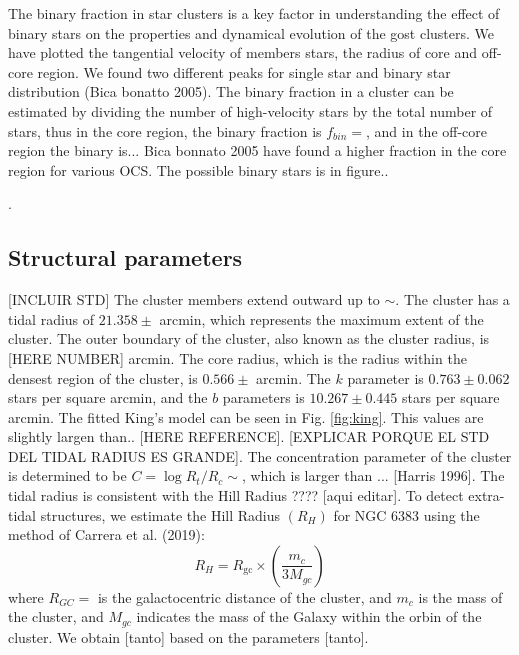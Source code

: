 \documentclass[fleqn,usenatbib,usedcolumn,useAMS]{mnras}
\begin{document}
The binary fraction in star clusters is a key factor in understanding the effect of binary stars on the properties and dynamical evolution of the gost clusters. We have plotted the tangential velocity of members stars, the radius of core and off-core region. We found two different peaks for single star and binary star distribution (Bica bonatto 2005). The binary fraction in a cluster can be estimated by dividing the number of high-velocity stars by the total number of stars, thus in the core region, the binary fraction is $f_{bin} =$, and in the off-core region the binary is... Bica  bonnato 2005 have found a higher fraction in the core region for various OCS. The possible binary stars is in figure..

. %



\subsection{Structural parameters}

[INCLUIR STD]
The cluster members extend outward up to $\sim $. The cluster has a tidal radius of $21.358 \pm$ arcmin, which represents the maximum extent of the cluster. The outer boundary of the cluster, also known as the cluster radius, is [HERE NUMBER] arcmin. The core radius, which is the radius within the densest region of the cluster, is $0.566 \pm$ arcmin. The $k$ parameter is $0.763 \pm 0.062$ stars per square arcmin, and the $b$ parameters is $10.267 \pm 0.445$ stars per square arcmin. The fitted King's model can be seen in Fig. \ref{fig:king}. This values are slightly largen than.. [HERE REFERENCE]. [EXPLICAR PORQUE EL STD DEL TIDAL RADIUS ES GRANDE]. The concentration parameter of the cluster is determined to be $C = \log{R_t/R_c} \sim$, which is larger than ... [Harris 1996]. The tidal radius is consistent with the Hill Radius ???? [aqui editar]. 
To detect extra-tidal structures, we estimate the Hill Radius $(R_H)$ for NGC 6383 using the method of Carrera et al. (2019):
\begin{equation*}
	R_H = R_{\text{gc}} \times \left(\frac{m_c}{3M_{gc}}\right)
\end{equation*}
where $R_{GC} = $ is the galactocentric distance of the cluster, and $m_c$ is the mass of the cluster, and $M_{gc}$ indicates the mass of the Galaxy within the orbin of the cluster. We obtain [tanto] based on the parameters [tanto]. 
\end{document}
